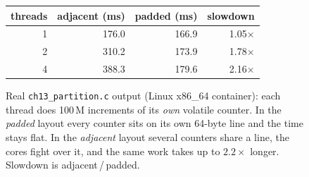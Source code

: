 \begin{figure}[htbp]
\centering
\begin{tabular}{rrrr}
\toprule
threads & adjacent (ms) & padded (ms) & slowdown \\
\midrule
1 & 176.0 & 166.9 & 1.05$\times$ \\
2 & 310.2 & 173.9 & 1.78$\times$ \\
4 & 388.3 & 179.6 & 2.16$\times$ \\
\bottomrule
\end{tabular}
\caption{Real \texttt{ch13\_partition.c} output (Linux x86\_64
container): each thread does 100\,M increments of its \emph{own}
volatile counter. In the \emph{padded} layout every counter sits on
its own 64-byte line and the time stays flat. In the \emph{adjacent}
layout several counters share a line, the cores fight over it, and
the same work takes up to $2.2\times$ longer. Slowdown is
adjacent\,/\,padded.}
\label{fig:falseshare13}
\end{figure}
